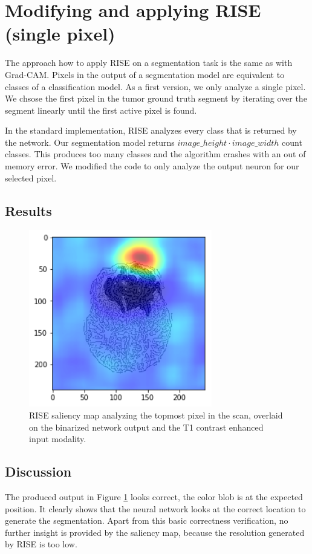 \section{Modifying and applying RISE (single pixel)}

The approach how to apply RISE on a segmentation task is the same as with Grad-CAM. Pixels in the output of a segmentation model are equivalent to classes of a classification model.
As a first version, we only analyze a single pixel. We chsose the first pixel in the tumor ground truth segment by iterating over the segment linearly until the first active pixel is found.

In the standard implementation, RISE analyzes every class that is returned by the network. Our segmentation model returns $ image\_height \cdot image\_width $ count classes. This produces too many classes and the algorithm crashes with an out of memory error. We modified the code to only analyze the output neuron for our selected pixel.

\subsection{Results}

\begin{figure}[H]
\centering
\includegraphics[width=8cm]{chapters/04_segmentation/images/rise_single_pixel.png}
\caption{RISE saliency map analyzing the topmost pixel in the scan, overlaid on the binarized network output and the T1 contrast enhanced input modality.}
\label{rise_single_pixel_result}
\end{figure}

\subsection{Discussion}
The produced output in Figure \ref{rise_single_pixel_result} looks correct, the color blob is at the expected position. It clearly shows that the neural network looks at the correct location to generate the segmentation.
Apart from this basic correctness verification, no further insight is provided by the saliency map, because the resolution generated by RISE is too low.

